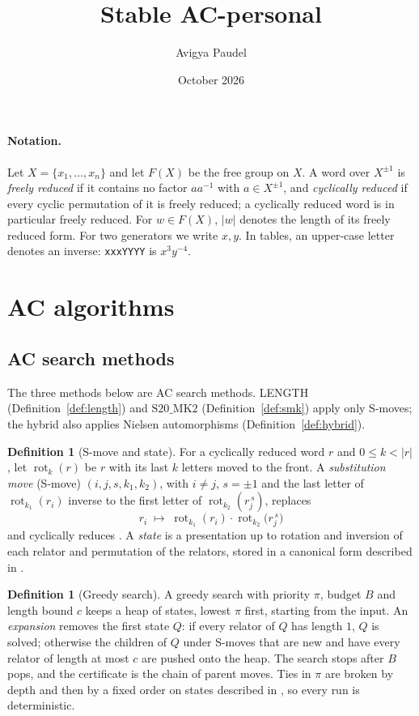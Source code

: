 \documentclass[11pt]{article}
\title{Stable AC-personal}
\author{Avigya Paudel}
\date{October 2026}
\theoremstyle{definition}
\newtheorem{definition}[theorem]{Definition}
\theoremstyle{remark}
\newcommand{\F}{F}
\newcommand{\rot}{\operatorname{rot}}
\newcommand{\SMK}{\mathrm{S20\_MK2}}
\begin{document}
\maketitle

\paragraph{Notation.} Let $X=\{x_1,\dots,x_n\}$ and let $\F(X)$ be the free group on $X$. A word over
$X^{\pm1}$ is \emph{freely reduced} if it contains no factor $aa^{-1}$ with $a\in X^{\pm1}$, and \emph{cyclically
reduced} if every cyclic permutation of it is freely reduced; a cyclically reduced
word is in particular freely reduced. For $w\in \F(X)$, $|w|$ denotes the length of its freely reduced form. For two generators we write $x,y$. In tables, an upper-case letter denotes an inverse: \texttt{xxxYYYY}
is $x^3y^{-4}$.

\section{AC algorithms}\label{sec:ac}

\subsection{AC search methods}\label{sec:methods}

The three methods below are AC search methods. LENGTH (Definition~\ref{def:length}) and $\SMK$ (Definition~\ref{def:smk}) apply only S-moves; the hybrid also applies Nielsen automorphisms (Definition~\ref{def:hybrid}).

\begin{definition}[S-move and state]\label{def:smove}
For a cyclically reduced word $r$ and $0\le k<|r|$, let $\rot_k(r)$ be $r$ with its last $k$ letters moved to the
front. A \emph{substitution move} (S-move) $(i,j,s,k_1,k_2)$, with $i\neq j$, $s=\pm1$ and the last letter of $\rot_{k_1}(r_i)$ inverse to the first letter of
$\rot_{k_2}(r_j^{\,s})$, replaces
\[
r_i\;\longmapsto\;\rot_{k_1}(r_i)\cdot\rot_{k_2}\!\big(r_j^{\,s}\big)
\]
and cyclically reduces \cite{FTS26}. A \emph{state} is a presentation up to rotation and inversion of each relator and permutation of the relators,
stored in a canonical form described in \cite{FTS26}.
\end{definition}

\begin{definition}[Greedy search]\label{def:greedy}
A greedy search with priority $\pi$, budget $B$ and length bound $c$ keeps a heap of states, lowest $\pi$ first,
starting from the input. An \emph{expansion} removes the first state $Q$: if every relator of $Q$ has length $1$, $Q$
is solved; otherwise the children of $Q$ under S-moves that are new and have every relator of length at most $c$ are pushed onto the heap. The search stops after $B$ pops, and the certificate is the chain of parent moves. Ties in $\pi$ are broken by depth and then by a fixed order on states described in \cite{FTS26}, so every run is deterministic.
\end{definition}
\end{document}
